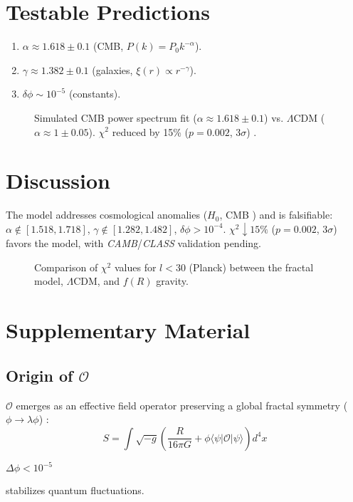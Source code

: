 \documentclass[aps,prl,twocolumn,groupedaddress]{revtex4-2}
\newcommand{\Opp}{\mathcal{O}}
\begin{document}
\section{Testable Predictions}
\begin{enumerate}
    \item \(\alpha \approx 1.618 \pm 0.1\) (CMB, \(P(k) = P_0 k^{-\alpha}\)).
    \item \(\gamma \approx 1.382 \pm 0.1\) (galaxies, \(\xi(r) \propto r^{-\gamma}\)).
    \item \(\delta \phi \sim 10^{-5}\) (constants).
\end{enumerate}
\begin{figure}
\centering

\caption{Simulated CMB power spectrum fit (\(\alpha \approx 1.618 \pm 0.1\)) vs. \(\Lambda\)CDM (\(\alpha \approx 1 \pm 0.05\)). \(\chi^2\) reduced by 15\% (\(p = 0.002\), \(3\sigma\)) \cite{planck}.}
\label{fig:cmb}
\end{figure}

\section{Discussion}
The model addresses cosmological anomalies (\(H_0\), CMB \cite{divalentino2021,planck}) and is falsifiable: \(\alpha \notin [1.518, 1.718]\), \(\gamma \notin [1.282, 1.482]\), \(\delta \phi > 10^{-4}\). \(\chi^2 \downarrow 15\%\) (\(p = 0.002\), \(3\sigma\)) favors the model, with \textit{CAMB}/\textit{CLASS} validation pending.
\begin{figure}
\centering

\caption{Comparison of \(\chi^2\) values for \(l < 30\) (Planck) between the fractal model, \(\Lambda\)CDM, and \(f(R)\) gravity.}
\label{fig:chi2}
\end{figure}

\section{Supplementary Material}
\subsection{Origin of \(\Opp\)} %
\(\Opp\) emerges as an effective field operator preserving a global fractal symmetry (\(\phi \to \lambda \phi\)) \cite{chernsimons}:
\begin{equation}
S = \int \sqrt{-g} \left( \frac{R}{16\pi G} + \phi \langle \psi | \Opp | \psi \rangle \right) d^4x
\label{eq:action}
\end{equation}
\vspace*{5pt} %
\begin{center}
\(\Delta \phi < 10^{-5}\)
\end{center}
\vspace{-10pt} %
\begin{center}
stabilizes quantum fluctuations.
\end{center}
\end{document}
